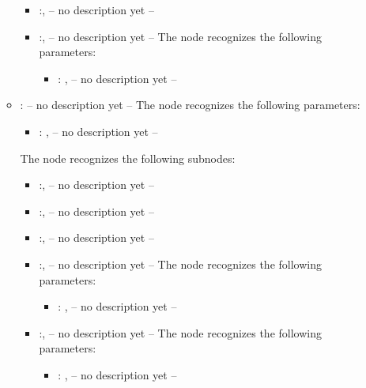 \begin{itemize}
\begin{itemize}
\begin{itemize}
            \item {}:, 
              -- no description yet --

            \item {}:, 
              -- no description yet --
              The  node recognizes the following parameters:
                \begin{itemize}
                  \item {}: , 
                    -- no description yet --
              \end{itemize}
          \end{itemize}

        \item {}:
          -- no description yet --
          The  node recognizes the following parameters:
            \begin{itemize}
              \item {}: , 
                -- no description yet --
          \end{itemize}

          The  node recognizes the following subnodes:
          \begin{itemize}
            \item {}:, 
              -- no description yet --

            \item {}:, 
              -- no description yet --

            \item {}:, 
              -- no description yet --

            \item {}:, 
              -- no description yet --
              The  node recognizes the following parameters:
                \begin{itemize}
                  \item {}: , 
                    -- no description yet --
              \end{itemize}

            \item {}:, 
              -- no description yet --
              The  node recognizes the following parameters:
                \begin{itemize}
                  \item {}: , 
                    -- no description yet --
              \end{itemize}


\end{itemize}
\end{itemize}
\end{itemize}
